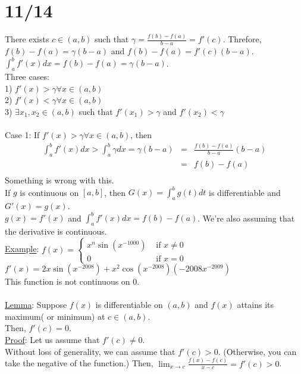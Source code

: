 \documentclass[11pt]{article}
\begin{document}
\section*{11/14}
	There exists $c \in (a,b)$ such that $\gamma = \frac{f(b) - f(a)}{b - a} =
	f'(c)$. Threfore, $f(b) - f(a) = \gamma (b-a)$ and $f(b) - f(a) = f'(c) 
	(b-a)$.\\
	$\int_a^b f'(x) dx = f(b) - f(a) = \gamma(b-a)$.\\
	Three cases:\\
	1) $f'(x) > \gamma \forall x \in (a,b)$\\
	2) $f'(x) < \gamma \forall x \in (a,b)$\\
	3) $\exists x_1,x_2  \in (a,b)$ such that $f'(x_1) > \gamma$ and $f'(x_2)
	< \gamma$\\\\
	Case 1: If $f'(x) > \gamma \forall x \in (a,b)$, then 
	\begin{eqnarray*}
		\int_a^b f'(x)dx  >  \int_a^b \gamma dx = \gamma(b-a) 
		& = & \frac{f(b)-f(a)}{b-a}(b-a)\\
		& = & f(b) - f(a)\\
	\end{eqnarray*}
	Something is wrong with this.\\
	If $g$ is continuous on $[a,b]$, then $G(x) = \int_a^b g(t)dt$ is 
	differentiable and $G'(x) = g(x)$.\\
	$g(x) = f'(x)$ and $\int_a^b f'(x) dx = f(b) - f(a)$. We're also
	assuming that the derivative is continuous.\\
	\underline{Example}: $f(x) = \begin{cases} x^n\sin(x^{-1000}) & 
	\text{ if } x \not= 0 \\ 0 & \text{ if } x = 0 \end{cases}$\\
	$f'(x) = 2x \sin (x^{-2008}) + x^2 \cos(x^{-2008})(-2008 x^{-2009})$\\
	This function is not continuous on $0$.\\\\
	\underline{Lemma}: Suppose $f(x)$ is differentiable on $(a,b)$ and $f(x)$
	attains its maximum( or minimum) at $c \in (a,b)$.\\
	Then, $f'(c) = 0$.\\
	\underline{Proof}: Let us assume that $f'(c) \not= 0$.\\
	Without loss of generality, we can assume that $f'(c) > 0$. (Otherwise, you
	can take the negative of the function.) Then, $\lim_{x \to c} \frac{f(x)
	- f(c)}{x -c} = f'(c) > 0$.\\
\end{document}
